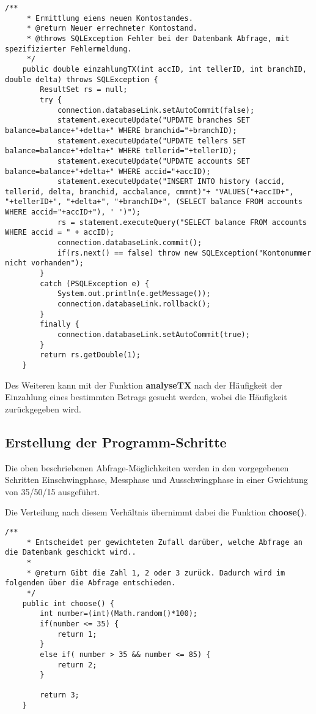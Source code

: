 \begin{lstlisting}[caption={einzahlungsTX-Funktion in TXHandler.java}]
	/**
	 * Ermittlung eiens neuen Kontostandes.
	 * @return Neuer errechneter Kontostand.
	 * @throws SQLException Fehler bei der Datenbank Abfrage, mit spezifizierter Fehlermeldung.
	 */
	public double einzahlungTX(int accID, int tellerID, int branchID, double delta) throws SQLException	{
		ResultSet rs = null;
		try {
			connection.databaseLink.setAutoCommit(false);
			statement.executeUpdate("UPDATE branches SET balance=balance+"+delta+" WHERE branchid="+branchID);
			statement.executeUpdate("UPDATE tellers SET balance=balance+"+delta+" WHERE tellerid="+tellerID);
			statement.executeUpdate("UPDATE accounts SET balance=balance+"+delta+" WHERE accid="+accID);
			statement.executeUpdate("INSERT INTO history (accid, tellerid, delta, branchid, accbalance, cmmnt)"+ "VALUES("+accID+", "+tellerID+", "+delta+", "+branchID+", (SELECT balance FROM accounts WHERE accid="+accID+"), ' ')");
			rs = statement.executeQuery("SELECT balance FROM accounts WHERE accid = " + accID);
			connection.databaseLink.commit();
			if(rs.next() == false) throw new SQLException("Kontonummer nicht vorhanden");
		}
		catch (PSQLException e) {
			System.out.println(e.getMessage());
			connection.databaseLink.rollback();
		}
		finally {
			connection.databaseLink.setAutoCommit(true);
		}
		return rs.getDouble(1);
	}
\end{lstlisting}
 

Des Weiteren kann mit der Funktion \textbf{analyseTX} nach der Häufigkeit der
Einzahlung eines bestimmten Betrags gesucht werden, wobei die Häufigkeit zurückgegeben wird.

\subsection{Erstellung der Programm-Schritte}
Die oben beschriebenen Abfrage-Möglichkeiten werden in den vorgegebenen
Schritten Einschwingphase, Messphase und Ausschwingphase in einer Gwichtung von
35/50/15 ausgeführt.

Die Verteilung nach diesem Verhältnis übernimmt dabei die Funktion
\textbf{choose()}.

\begin{lstlisting}[caption={choose-Funktion in ProgramStage.java}]
	/**
	 * Entscheidet per gewichteten Zufall darüber, welche Abfrage an die Datenbank geschickt wird..
	 * 
	 * @return Gibt die Zahl 1, 2 oder 3 zurück. Dadurch wird im folgenden über die Abfrage entschieden.
	 */
	public int choose() {
		int number=(int)(Math.random()*100);
		if(number <= 35) {
			return 1;
		}
		else if( number > 35 && number <= 85) {
			return 2;
		}
		
		return 3;
	}
\end{lstlisting}

